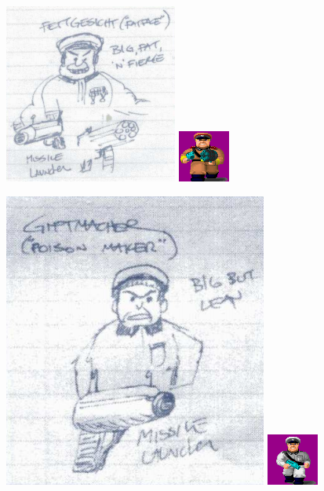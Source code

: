 \documentclass[book.tex]{subfiles}
\begin{document}
   \begin{figure}[H]
\centering
 \includegraphics[scale=1]{imgs/tom_hall_sketch_officer.png}
\includegraphics[scale=9]{imgs/sprites/fettgesic.png}
 \end{figure}
 
   \begin{figure}[H]
\centering
 \includegraphics[scale=0.5]{imgs/tom_hall_sketch_officer2.png}
 \includegraphics[scale=8]{imgs/sprites/giftmacher.png}

 \end{figure}
 
 
\end{document}
